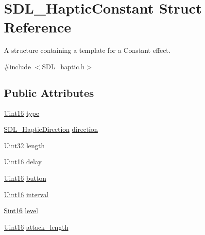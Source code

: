 \hypertarget{struct_s_d_l___haptic_constant}{}\section{S\+D\+L\+\_\+\+Haptic\+Constant Struct Reference}
\label{struct_s_d_l___haptic_constant}


A structure containing a template for a Constant effect.  




{\ttfamily \#include $<$S\+D\+L\+\_\+haptic.\+h$>$}

\subsection*{Public Attributes}
\begin{DoxyCompactItemize}
\item 
\mbox{\hyperlink{_s_d_l__stdinc_8h_a31fcc0a076c9068668173ee26d33e42b}{Uint16}} \mbox{\hyperlink{struct_s_d_l___haptic_constant_a5cb31202803a8bc1be95fcede5ac8afb}{type}}
\item 
\mbox{\hyperlink{struct_s_d_l___haptic_direction}{S\+D\+L\+\_\+\+Haptic\+Direction}} \mbox{\hyperlink{struct_s_d_l___haptic_constant_a3e871debf4e57c35960f019d2605d84f}{direction}}
\item 
\mbox{\hyperlink{_s_d_l__stdinc_8h_add440eff171ea5f55cb00c4a9ab8672d}{Uint32}} \mbox{\hyperlink{struct_s_d_l___haptic_constant_aeb994c356b1d236b060f277d157e98ec}{length}}
\item 
\mbox{\hyperlink{_s_d_l__stdinc_8h_a31fcc0a076c9068668173ee26d33e42b}{Uint16}} \mbox{\hyperlink{struct_s_d_l___haptic_constant_a16a751009893f5412201e3ce91146b25}{delay}}
\item 
\mbox{\hyperlink{_s_d_l__stdinc_8h_a31fcc0a076c9068668173ee26d33e42b}{Uint16}} \mbox{\hyperlink{struct_s_d_l___haptic_constant_aa65321f1b002adaab6e629d5bed556e9}{button}}
\item 
\mbox{\hyperlink{_s_d_l__stdinc_8h_a31fcc0a076c9068668173ee26d33e42b}{Uint16}} \mbox{\hyperlink{struct_s_d_l___haptic_constant_ab1f7f0df856f4cf1fdf937cb886226b4}{interval}}
\item 
\mbox{\hyperlink{_s_d_l__stdinc_8h_a9d0257032c0e146ab6121bf0122712f5}{Sint16}} \mbox{\hyperlink{struct_s_d_l___haptic_constant_a5b095eea77464623ed57af15f29f4ca6}{level}}
\item 
\mbox{\hyperlink{_s_d_l__stdinc_8h_a31fcc0a076c9068668173ee26d33e42b}{Uint16}} \mbox{\hyperlink{struct_s_d_l___haptic_constant_a907bade68ab53fb24e7d2651d19b767f}{attack\+\_\+length}}

\end{DoxyCompactItemize}
